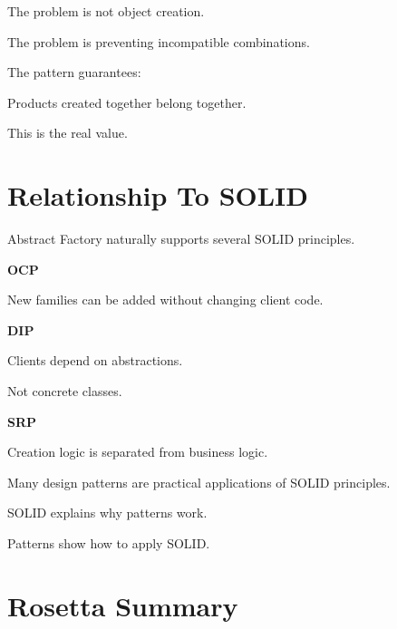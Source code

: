 \documentclass[11pt,a4paper]{book}
\begin{document}
The problem is not object creation.

The problem is preventing incompatible combinations.

The pattern guarantees:

\begin{center}
Products created together belong together.
\end{center}

This is the real value.


\section{Relationship To SOLID}

\begin{idea}

Abstract Factory naturally supports several SOLID
principles.

\end{idea}

\textbf{OCP}

New families can be added without changing client code.

\bigskip

\textbf{DIP}

Clients depend on abstractions.

Not concrete classes.

\bigskip

\textbf{SRP}

Creation logic is separated from business logic.

\begin{rosettarule}

Many design patterns are practical applications of
SOLID principles.

SOLID explains why patterns work.

Patterns show how to apply SOLID.

\end{rosettarule}


\section{Rosetta Summary}
\end{document}
